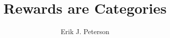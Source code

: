 \documentclass[12pt]{article}
\title{Rewards are Categories}			%
\author{Erik J. Peterson}				%
\begin{document}

\titlep						%
\tableofcontents 			%
\newpage

\newpage

\newpage

\thebib						%

\end{document}
